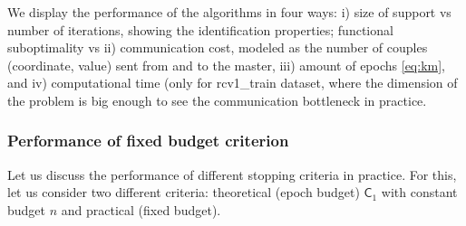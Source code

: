 We display the performance of the algorithms in four ways: i) size of support vs number of iterations, showing the identification properties; functional suboptimality vs ii) communication cost, modeled as the number of couples (coordinate, value) sent from and to the master, iii) amount of epochs \eqref{eq:km}, and iv) computational time (only for rcv1\_train dataset, where the dimension of the problem is big enough to see the communication bottleneck in practice.


\subsubsection{Performance of fixed budget criterion}
Let us discuss the performance of different stopping criteria in practice. For this, let us consider two different criteria: theoretical (epoch budget) $\mathsf{C}_1$ with constant budget $n$ and practical (fixed budget).


